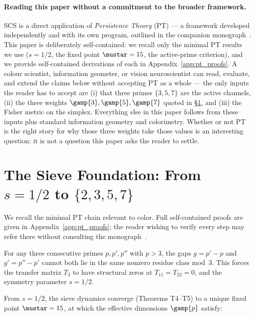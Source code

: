 \documentclass[12pt,a4paper]{article}
\begin{document}
\paragraph{Reading this paper without a commitment to the broader framework.}
SCS is a direct application of \emph{Persistence Theory} (PT) ---
a framework developed independently and with its own program,
outlined in the companion monograph~\cite{senez2026math}. This paper is
deliberately self-contained: we recall only the minimal PT results we
use ($s = 1/2$, the fixed point $\mustar = 15$, the active-prime
criterion), and we provide self-contained derivations of each in
Appendix~\ref{app:pt_proofs}. A colour scientist, information
geometer, or vision neuroscientist can read, evaluate, and extend the
claims below without accepting PT as a whole --- the only inputs the
reader has to accept are (i) that three primes $\{3, 5, 7\}$ are the
active channels, (ii) the three weights $\gamp{3}, \gamp{5}, \gamp{7}$
quoted in \S\ref{sec:foundation}, and (iii) the Fisher metric on the
simplex. Everything else in this paper follows from these inputs plus
standard information geometry and colorimetry. Whether or not PT is
the right story for why those three weights take those values is an
interesting question; it is not a question this paper asks the reader
to settle.

\section{The Sieve Foundation: From $s = 1/2$ to $\{2, 3, 5, 7\}$}
\label{sec:foundation}

We recall the minimal PT chain relevant to color. Full
self-contained proofs are given in Appendix~\ref{app:pt_proofs};
the reader wishing to verify every step may refer there without
consulting the monograph~\cite{senez2026math}.

\begin{theorembox}
For any three consecutive primes $p, p', p''$ with $p > 3$, the gaps
$g = p'-p$ and $g' = p''-p'$ cannot both lie in the same nonzero
residue class mod~3. This forces the transfer matrix $T_3$ to have
structural zeros at $T_{11} = T_{22} = 0$, and the symmetry parameter
$s = 1/2$.
\end{theorembox}

From $s = 1/2$, the sieve dynamics converge (Theorems T4--T5) to a
unique fixed point $\mustar = 15$, at which the effective dimensions
$\gamp{p}$ satisfy:
\end{document}
